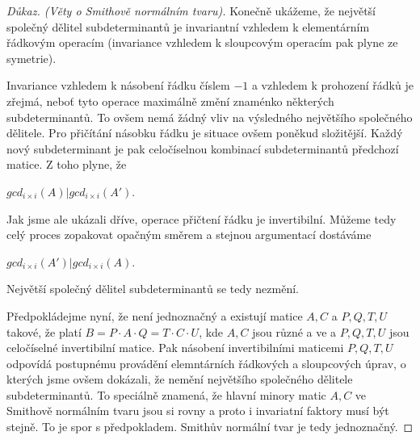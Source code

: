 \begin{proof}[Důkaz. (Věty o Smithově normálním tvaru)]
Konečně ukážeme, že největší společný dělitel subdeterminantů je invariantní
vzhledem k elementárním řádkovým operacím (invariance vzhledem k sloupcovým
operacím pak plyne ze symetrie).

Invariance vzhledem k násobení řádku číslem $ -1 $ a vzhledem k prohození řádků
je zřejmá, neboť tyto operace maximálně změní znaménko některých subdeterminantů.
To ovšem nemá žádný vliv na výsledného největšího společného dělitele. Pro přičítání
násobku řádku je situace ovšem poněkud složitější. Každý nový subdeterminant je
pak celočíselnou kombinací subdeterminantů předchozí matice. Z toho plyne, že
\begin{center}
$ gcd_{i \times i }(A) \vert gcd_{i \times i }(A') $.
\end{center}

Jak jsme ale ukázali dříve, operace přičtení řádku je invertibilní. Můžeme tedy
celý proces zopakovat opačným směrem a stejnou argumentací dostáváme
\begin{center}
$ gcd_{i \times i }(A') \vert gcd_{i \times i }(A) $.
\end{center}
Největší společný dělitel subdeterminantů se tedy nezmění.

Předpokládejme nyní, že \snf není jednoznačný a existují matice $ A,C $ a $ P,Q,T,U$
takové, že platí $ B = P \cdot A \cdot Q = T \cdot C \cdot U $, kde $ A,C $ jsou
různé a ve \snf a $ P,Q,T,U$ jsou celočíselné invertibilní matice. Pak násobení
invertibilními maticemi $ P,Q,T,U$ odpovídá postupnému provádění elemntárních
řádkových a sloupcových úprav, o kterých jsme ovšem dokázali, že nemění největšího
společného dělitele subdeterminantů. To speciálně znamená, že hlavní minory matic
$ A,C $ ve Smithově normálním tvaru jsou si rovny a proto i invariatní faktory
musí být stejně. To je spor s předpokladem. Smithův normální tvar je tedy jednoznačný.

\end{proof}

